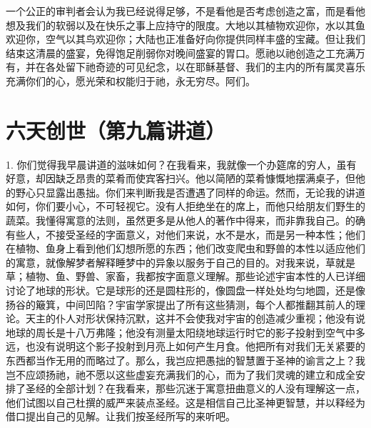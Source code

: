 一个公正的审判者会认为我已经说得足够，不是看他是否考虑创造之富，而是看他想及我们的软弱以及在快乐之事上应持守的限度。大地以其植物欢迎你，水以其鱼欢迎你，空气以其鸟欢迎你；大陆也正准备好向你提供同样丰盛的宝藏。但让我们结束这清晨的盛宴，免得饱足削弱你对晚间盛宴的胃口。愿祂以祂创造之工充满万有，并在各处留下祂奇迹的可见纪念，以在耶稣基督、我们的主内的所有属灵喜乐充满你们的心，愿光荣和权能归于祂，永无穷尽。阿们。\par



\section{六天创世（第九篇讲道）}

\par

1. 你们觉得我早晨讲道的滋味如何？在我看来，我就像一个办筵席的穷人，虽有好意，却因缺乏昂贵的菜肴而使宾客扫兴。他以简陋的菜肴慷慨地摆满桌子，但他的野心只显露出愚拙。你们来判断我是否遭遇了同样的命运。然而，无论我的讲道如何，你们要小心，不可轻视它。没有人拒绝坐在的席上，而他只给朋友们野生的蔬菜。我懂得寓意的法则，虽然更多是从他人的著作中得来，而非靠我自己。的确有些人，不接受圣经的字面意义，对他们来说，水不是水，而是另一种本性；他们在植物、鱼身上看到他们幻想所愿的东西；他们改变爬虫和野兽的本性以适应他们的寓意，就像解梦者解释睡梦中的异象以服务于自己的目的。对我来说，草就是草；植物、鱼、野兽、家畜，我都按字面意义理解。那些论述宇宙本性的人已详细讨论了地球的形状。它是球形的还是圆柱形的，像圆盘一样处处均匀地圆，还是像扬谷的簸箕，中间凹陷？宇宙学家提出了所有这些猜测，每个人都推翻其前人的理论。天主的仆人对形状保持沉默，这并不会使我对宇宙的创造减少重视；他没有说地球的周长是十八万弗隆；他没有测量太阳绕地球运行时它的影子投射到空气中多远，也没有说明这个影子投射到月亮上如何产生月食。他把所有对我们无关紧要的东西都当作无用的而略过了。那么，我岂应把愚拙的智慧置于圣神的谕言之上？我岂不应颂扬祂，祂不愿以这些虚妄充满我们的心，而为了我们灵魂的建立和成全安排了圣经的全部计划？在我看来，那些沉迷于寓意扭曲意义的人没有理解这一点，他们试图以自己杜撰的威严来装点圣经。这是相信自己比圣神更智慧，并以释经为借口提出自己的见解。让我们按圣经所写的来听吧。\par

